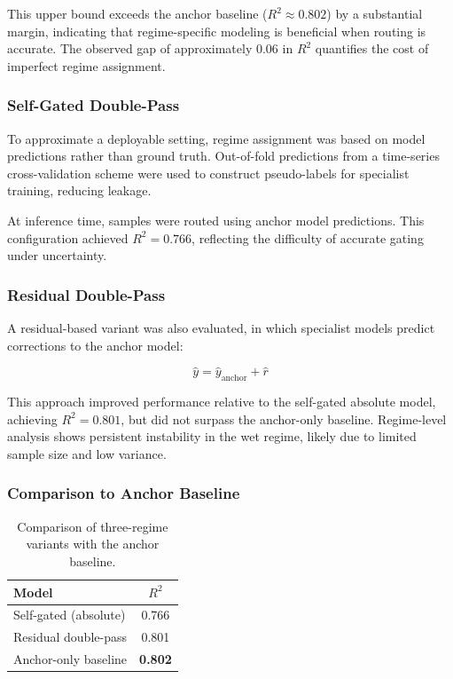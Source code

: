 This upper bound exceeds the anchor baseline ($R^2 \approx 0.802$) by a substantial margin, indicating that regime-specific modeling is beneficial when routing is accurate. The observed gap of approximately $0.06$ in $R^2$ quantifies the cost of imperfect regime assignment.

\subsubsection*{Self-Gated Double-Pass}
To approximate a deployable setting, regime assignment was based on model predictions rather than ground truth. Out-of-fold predictions from a time-series cross-validation scheme were used to construct pseudo-labels for specialist training, reducing leakage.

At inference time, samples were routed using anchor model predictions. This configuration achieved $R^2 = 0.766$, reflecting the difficulty of accurate gating under uncertainty.

\subsubsection*{Residual Double-Pass}
A residual-based variant was also evaluated, in which specialist models predict corrections to the anchor model:

\[
\hat{y} = \hat{y}_{\text{anchor}} + \hat{r}
\]

This approach improved performance relative to the self-gated absolute model, achieving $R^2 = 0.801$, but did not surpass the anchor-only baseline. Regime-level analysis shows persistent instability in the wet regime, likely due to limited sample size and low variance.

\subsubsection*{Comparison to Anchor Baseline}

\begin{table}[H]
\centering
\begin{tabular}{lc}
\toprule
\textbf{Model} & \textbf{$R^2$} \\
\midrule
Self-gated (absolute) & 0.766 \\
Residual double-pass & 0.801 \\
Anchor-only baseline & \textbf{0.802} \\
\bottomrule
\end{tabular}
\caption{Comparison of three-regime variants with the anchor baseline.}
\end{table}

